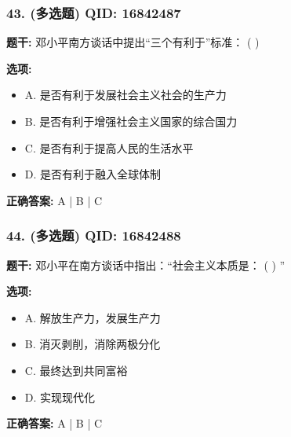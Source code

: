 \documentclass[12pt,UTF8]{ctexart}
\begin{document}
\vspace{0.3em}\hrulefill\vspace{0.7em}

\subsubsection*{43. (多选题) \small QID: 16842487}

\textbf{题干:}
邓小平南方谈话中提出“三个有利于”标准： ( )

\textbf{选项:}
\begin{itemize}[leftmargin=*]

  \item A. 是否有利于发展社会主义社会的生产力

  \item B. 是否有利于增强社会主义国家的综合国力

  \item C. 是否有利于提高人民的生活水平

  \item D. 是否有利于融入全球体制

\end{itemize}

\textbf{正确答案:}
A | B | C

\vspace{0.3em}\hrulefill\vspace{0.7em}

\subsubsection*{44. (多选题) \small QID: 16842488}

\textbf{题干:}
邓小平在南方谈话中指出：“社会主义本质是： ( ) ”

\textbf{选项:}
\begin{itemize}[leftmargin=*]

  \item A. 解放生产力，发展生产力

  \item B. 消灭剥削，消除两极分化

  \item C. 最终达到共同富裕

  \item D. 实现现代化

\end{itemize}

\textbf{正确答案:}
A | B | C

\vspace{0.3em}\hrulefill\vspace{0.7em}
\end{document}
